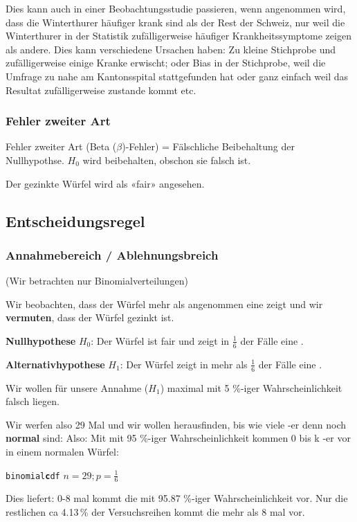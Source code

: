 Dies kann auch in einer Beobachtungsstudie passieren, wenn \zB
angenommen wird, dass die Winterthurer häufiger krank sind als der
Rest der Schweiz, nur weil die Winterthurer in der Statistik
zufälligerweise häufiger Krankheitssymptome zeigen als andere. Dies
kann verschiedene Ursachen haben: Zu kleine Stichprobe und
zufälligerweise einige Kranke erwischt; oder Bias in der Stichprobe,
weil die Umfrage zu nahe am Kantonsspital stattgefunden hat oder ganz
einfach weil das Resultat zufälligerweise zustande kommt etc.

\subsubsection{Fehler zweiter Art}
Fehler zweiter Art (Beta ($\beta$)-Fehler) = Fälschliche Beibehaltung
der Nullhypothse. $H_0$ wird beibehalten, obschon sie falsch ist. 

Der gezinkte Würfel wird als «fair» angesehen.

\TNTeop{}
\newpage


\subsection{Entscheidungsregel}
\subsubsection*{Annahmebereich / Ablehnungsbreich}
(Wir betrachten nur Binomialverteilungen)

Wir beobachten, dass der Würfel mehr als angenommen eine 
zeigt und wir \textbf{vermuten}, dass der Würfel gezinkt ist.

\textbf{Nullhypothese} $H_0$: Der Würfel ist fair und zeigt in
$\frac16$ der Fälle eine .

\textbf{Alternativhypothese} $H_1$: Der Würfel zeigt in mehr als
$\frac{1}{6}$ der Fälle eine .

Wir wollen für unsere Annahme ($H_1$) maximal mit 5 \%-iger
Wahrscheinlichkeit falsch liegen.

Wir werfen also 29 Mal und wir wollen herausfinden, bis wie viele
-er denn noch \textbf{normal} sind:
Also: Mit mit 95 \%-iger Wahrscheinlichkeit kommen 0 bis k
-er vor in einem normalen Würfel:

\texttt{binomial\textbf{c}df} $n=29; p=\frac16$

Dies liefert: 0-8 mal kommt die  mit 95.87 \%-iger
Wahrscheinlichkeit vor. Nur die restlichen ca 4.13\,\% der
Versuchsreihen kommt die  mehr als 8 mal vor.


